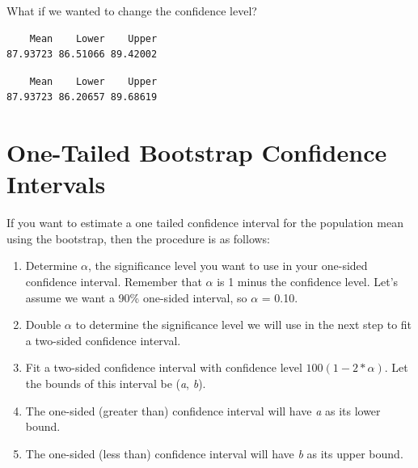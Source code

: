 \documentclass[
]{book}
\newenvironment{Shaded}{\begin{snugshade}}{\end{snugshade}}
\newcommand{\DataTypeTok}[1]{\textcolor[rgb]{0.13,0.29,0.53}{#1}}
\newcommand{\DecValTok}[1]{\textcolor[rgb]{0.00,0.00,0.81}{#1}}
\newcommand{\FloatTok}[1]{\textcolor[rgb]{0.00,0.00,0.81}{#1}}
\newcommand{\KeywordTok}[1]{\textcolor[rgb]{0.13,0.29,0.53}{\textbf{#1}}}
\newcommand{\NormalTok}[1]{#1}
\newcommand{\OperatorTok}[1]{\textcolor[rgb]{0.81,0.36,0.00}{\textbf{#1}}}
\newcommand{\StringTok}[1]{\textcolor[rgb]{0.31,0.60,0.02}{#1}}
\providecommand{\tightlist}{%
  \setlength{\itemsep}{0pt}\setlength{\parskip}{0pt}}
\begin{document}
What if we wanted to change the confidence level?

\begin{Shaded}
\end{Shaded}

\begin{verbatim}
    Mean    Lower    Upper 
87.93723 86.51066 89.42002 
\end{verbatim}

\begin{Shaded}
\end{Shaded}

\begin{verbatim}
    Mean    Lower    Upper 
87.93723 86.20657 89.68619 
\end{verbatim}

\hypertarget{one-tailed-bootstrap-confidence-intervals}{%
\section{One-Tailed Bootstrap Confidence Intervals}\label{one-tailed-bootstrap-confidence-intervals}}

If you want to estimate a one tailed confidence interval for the population mean using the bootstrap, then the procedure is as follows:

\begin{enumerate}
\def\labelenumi{\arabic{enumi}.}
\tightlist
\item
  Determine \(\alpha\), the significance level you want to use in your one-sided confidence interval. Remember that \(\alpha\) is 1 minus the confidence level. Let's assume we want a 90\% one-sided interval, so \(\alpha\) = 0.10.
\item
  Double \(\alpha\) to determine the significance level we will use in the next step to fit a two-sided confidence interval.
\item
  Fit a two-sided confidence interval with confidence level \(100(1 - 2*\alpha)\). Let the bounds of this interval be (\emph{a}, \emph{b}).
\item
  The one-sided (greater than) confidence interval will have \emph{a} as its lower bound.
\item
  The one-sided (less than) confidence interval will have \emph{b} as its upper bound.
\end{enumerate}
\end{document}
